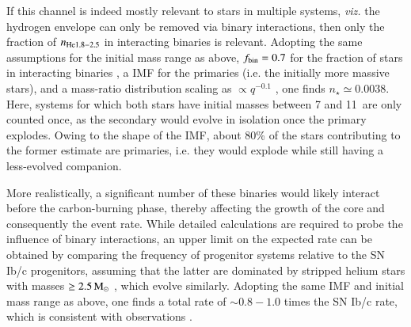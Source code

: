 \documentclass[twocolumn]{aa}
\begin{document}
If this channel is indeed mostly relevant to stars in multiple systems, {\it viz.} the hydrogen envelope can only be removed via binary 
interactions, then only the fraction of $n_{\rm{He}1.8-2.5}$ in interacting binaries is relevant. 
Adopting the same assumptions for the initial mass range as above, $f_{\rm bin}=0.7$ for the fraction of stars in interacting binaries \citep{Sana:2012px}, a \cite{Chabrier:2004vw} IMF for the primaries (i.e. the 
initially more massive stars), and a mass-ratio distribution scaling as $\propto q^{-0.1}$ \citep{Sana:2012px}, one finds $n_\star \simeq 0.0038$. Here, systems for which both stars have initial masses between 7 and 11\msun\ are only counted once, as the secondary would evolve in isolation once the primary explodes. Owing to the shape of the IMF, about 80\% of the stars contributing to the former estimate are primaries, i.e. they would explode while still having a less-evolved companion. 

 More realistically, a significant number of these binaries would likely interact before the carbon-burning phase, thereby 
 affecting the growth of the core and consequently the event rate. While detailed  calculations are required to probe the 
 influence  of binary interactions, an upper limit on the expected rate can be obtained by comparing  the frequency of 
 progenitor systems  relative to  the SN Ib/c progenitors, assuming that the latter are dominated by stripped helium stars 
 with masses $\ge 2.5\mathrm{\,M_\odot}$ \citep{Woosley:2019sdf}, which evolve similarly. Adopting the same IMF and initial mass range 
 as above, one finds a total rate of $\sim 0.8-1.0$ times the SN Ib/c rate, which is consistent with observations \citep[][and references therein]{branch2017}. 
\end{document}
